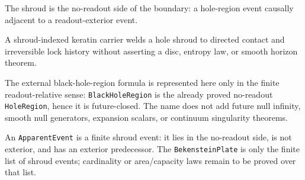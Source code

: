 \begin{proposition}\label{thm:hole-shroud}\leanok{}
The shroud is the no-readout side of the boundary: a hole-region event
causally adjacent to a readout-exterior event.
\end{proposition}

\begin{proposition}\label{thm:shroud-indexed-keratin}\leanok{}
A shroud-indexed keratin carrier welds a hole shroud to directed contact
and irreversible lock history without asserting a disc, entropy law, or smooth
horizon theorem.
\end{proposition}

\begin{theorem}\label{thm:black-hole-region-proxy}\leanok{}
The external black-hole-region formula is represented here only in the finite
readout-relative sense: \texttt{BlackHoleRegion} is the already proved no-readout
\texttt{HoleRegion}, hence it is future-closed.  The name does not add future
null infinity, smooth null generators, expansion scalars, or continuum
singularity theorems.
\end{theorem}

\begin{theorem}\label{thm:finite-apparent-event-plate}\leanok{}
An \texttt{ApparentEvent} is a finite shroud event: it lies in the no-readout
side, is not exterior, and has an exterior predecessor.  The
\texttt{BekensteinPlate} is only the finite list of shroud events; cardinality or
area/capacity laws remain to be proved over that list.
\end{theorem}

